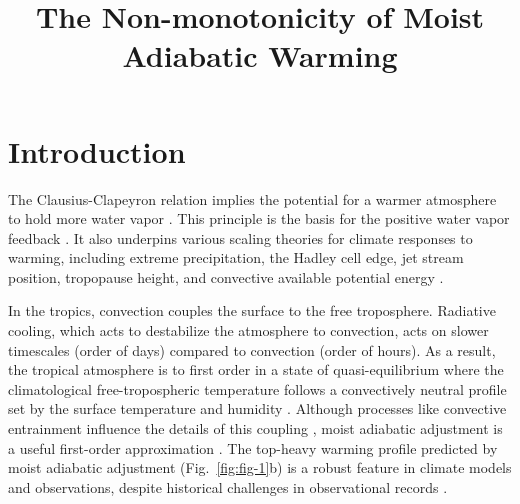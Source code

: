 \documentclass[]{ametsocV6.1}
\title{The Non-monotonicity of Moist Adiabatic Warming}
\affiliation{\aff{a}{Department of Geosciences, Union College, Schenectady New York, USA}}
\begin{document}
\maketitle

%
\section{Introduction}

The Clausius-Clapeyron relation implies the potential for a warmer atmosphere to hold more water vapor \citep{emanuel1994}. This principle is the basis for the positive water vapor feedback \citep{held2000a}. It also underpins various scaling theories for climate responses to warming, including extreme precipitation, the Hadley cell edge, jet stream position, tropopause height, and convective available potential energy \citep[CAPE;][]{oGorman2015, shaw2016b, romps2016}. 

In the tropics, convection couples the surface to the free troposphere. Radiative cooling, which acts to destabilize the atmosphere to convection, acts on slower timescales (order of days) compared to convection (order of hours). As a result, the tropical atmosphere is to first order in a state of quasi-equilibrium where the climatological free-tropospheric temperature follows a convectively neutral profile set by the surface temperature and humidity \cite{arakawa1974}. Although processes like convective entrainment influence the details of this coupling \citep{miyawaki2020, keil2021}, moist adiabatic adjustment is a useful first-order approximation \citep{held1993}. The top-heavy warming profile predicted by moist adiabatic adjustment (Fig.~\ref{fig:fig-1}b) is a robust feature in climate models and observations, despite historical challenges in observational records \citep{vallis2015, santer2005}.
\end{document}
